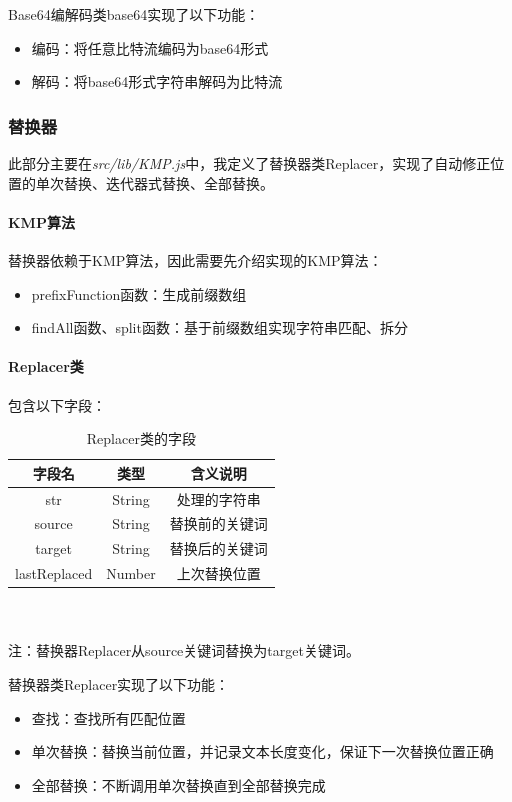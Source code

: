\documentclass[scheme = chinese]{ctexart}
\begin{document}
Base64编解码类base64实现了以下功能：
\begin{itemize}
    \item 编码：将任意比特流编码为base64形式
    \item 解码：将base64形式字符串解码为比特流
\end{itemize}

\subsubsection{替换器}
此部分主要在\emph{src/lib/KMP.js}中，我定义了替换器类Replacer，实现了自动修正位置的单次替换、迭代器式替换、全部替换。

\paragraph{KMP算法}
替换器依赖于KMP算法，因此需要先介绍实现的KMP算法：
\begin{itemize}
    \item prefixFunction函数：生成前缀数组
    \item findAll函数、split函数：基于前缀数组实现字符串匹配、拆分
\end{itemize}

\paragraph{Replacer类} 包含以下字段：
\begin{table}[H]
    \centering
    \caption{Replacer类的字段}
    \begin{tabular}{ccc}
        \toprule
        字段名 & 类型 & 含义说明 \\
        \midrule
        str & String & 处理的字符串 \\
        source & String & 替换前的关键词 \\
        target & String & 替换后的关键词 \\
        lastReplaced & Number & 上次替换位置 \\
        \bottomrule
    \end{tabular} \\~\\
    {\small 
注：替换器Replacer从source关键词替换为target关键词。}
\end{table}

替换器类Replacer实现了以下功能：
\begin{itemize}
    \item 查找：查找所有匹配位置
    \item 单次替换：替换当前位置，并记录文本长度变化，保证下一次替换位置正确
    \item 全部替换：不断调用单次替换直到全部替换完成
\end{itemize}
\end{document}
